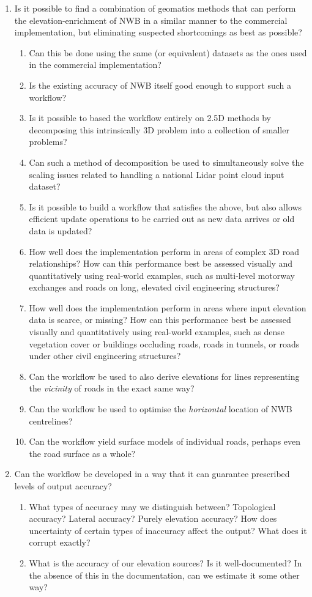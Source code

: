 \begin{enumerate}
\item Is it possible to find a combination of geomatics methods that can perform the elevation-enrichment of NWB in a similar manner to the commercial implementation, but eliminating suspected shortcomings as best as possible?
\begin{enumerate}
    \item Can this be done using the same (or equivalent) datasets as the ones used in the commercial implementation?
    \item Is the existing accuracy of NWB itself good enough to support such a workflow?
    \item Is it possible to based the workflow entirely on 2.5D methods by decomposing this intrinsically 3D problem into a collection of smaller problems?
    \item Can such a method of decomposition be used to simultaneously solve the scaling issues related to handling a national Lidar point cloud input dataset?
    \item Is it possible to build a workflow that satisfies the above, but also allows efficient update operations to be carried out as new data arrives or old data is updated?
    \item How well does the implementation perform in areas of complex 3D road relationships? How can this performance best be assessed visually and quantitatively using real-world examples, such as multi-level motorway exchanges and roads on long, elevated civil engineering structures?
    \item How well does the implementation perform in areas where input elevation data is scarce, or missing? How can this performance best be assessed visually and quantitatively using real-world examples, such as dense vegetation cover or buildings occluding roads, roads in tunnels, or roads under other civil engineering structures?
    \item Can the workflow be used to also derive elevations for lines representing the \textit{vicinity} of roads in the exact same way?
    \item Can the workflow be used to optimise the \textit{horizontal} location of NWB centrelines?
    \item Can the workflow yield surface models of individual roads, perhaps even the road surface as a whole?
\end{enumerate}
\item Can the workflow be developed in a way that it can guarantee prescribed levels of output accuracy?
\begin{enumerate}
\item What types of accuracy may we distinguish between? Topological accuracy? Lateral accuracy? Purely elevation accuracy? How does uncertainty of certain types of inaccuracy affect the output? What does it corrupt exactly?
\item What is the accuracy of our elevation sources? Is it well-documented? In the absence of this in the documentation, can we estimate it some other way?
\tiem 
\end{enumerate}
\end{enumerate}
